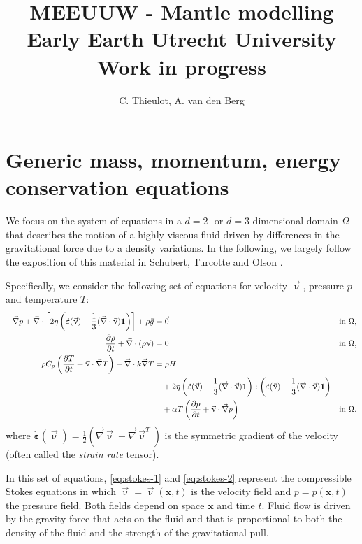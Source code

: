 \documentclass[a4paper]{article}
\title{MEEUUW - Mantle modelling Early Earth Utrecht University Work in progress}
\author{C. Thieulot, A. van den Berg}
\begin{document}
\maketitle

\section{Generic mass, momentum, energy conservation equations}

We focus on the system of equations in a $d=2$- or $d=3$-dimensional
domain $\Omega$ that describes the motion of a highly viscous fluid driven
by differences in the gravitational force due to a density variations. 
In the following, we largely follow the exposition of this
material in Schubert, Turcotte and Olson \cite{scto01}.

Specifically, we consider the following set of equations for 
velocity $\vec\upnu$, pressure $p$ and temperature $T$:
\begin{align}
  \label{eq:stokes-1}
  - \vec\nabla p +  
  \vec\nabla \cdot \left[2\eta \left(\dot{\bm \varepsilon}(\vec \upnu)
                                  - \frac{1}{3}(\vec\nabla \cdot \vec \upnu)\mathbf 1\right)
                \right] +  \rho \vec g &= \vec{0}
  &
  & \textrm{in $\Omega$},
  \\
  \label{eq:stokes-2}
  \frac{\partial \rho}{\partial t} + \vec\nabla \cdot (\rho \vec \upnu) &= 0
  &
  & \textrm{in $\Omega$},
  \\
  \label{eq:temperature}
  \rho C_p \left(\frac{\partial T}{\partial t} + \vec \upnu\cdot\vec\nabla T\right)
  - \vec\nabla\cdot k\vec\nabla T
  &=
  \rho H
  \notag
  \\
  &\quad
  +
  2\eta
  \left(\dot\varepsilon(\vec\upnu) - \frac{1}{3}(\vec\nabla \cdot \vec \upnu)\mathbf 1\right)
  :
  \left(\dot\varepsilon(\vec\upnu) - \frac{1}{3}(\vec\nabla \cdot \vec \upnu)\mathbf 1\right)
  \\
  &\quad
  +\alpha T \left( \frac{\partial p}{\partial t} +  \vec \upnu \cdot \vec\nabla p \right)
  && \textrm{in $\Omega$},
\end{align}
where $\dot{\bm \varepsilon}(\vec\upnu) = \frac{1}{2}(\vec\nabla \vec\upnu + \vec\nabla \vec\upnu^T)$
is the symmetric gradient of the velocity (often called the
\textit{strain rate} tensor).

In this set of equations, \eqref{eq:stokes-1} and \eqref{eq:stokes-2}
represent the compressible Stokes equations in which $\vec\upnu =\vec\upnu (\mathbf x,t)$
is the velocity field and $p=p(\mathbf x,t)$ the pressure
field. Both fields depend on space $\mathbf x$ and time $t$. Fluid flow is
driven by the gravity force that acts on the fluid and that is proportional to
both the density of the fluid and the strength of the gravitational pull.
\end{document}
